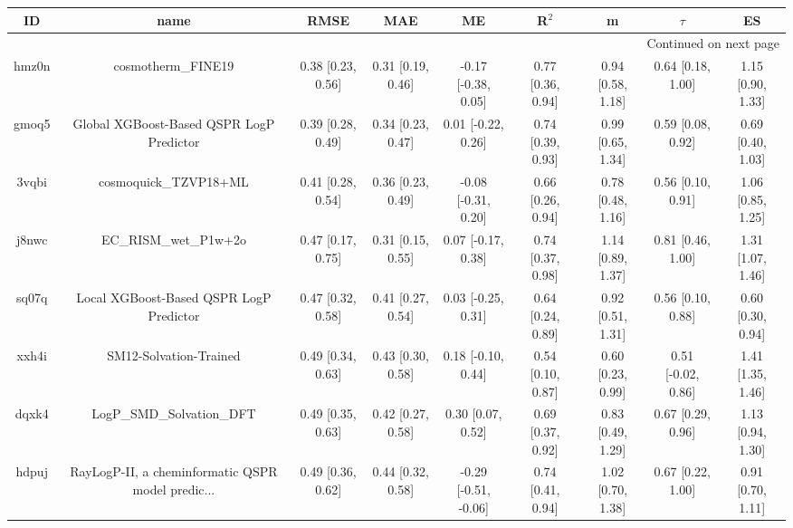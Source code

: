 \documentclass{article}
\begin{document}
\begin{center}
\scriptsize
\begin{longtable}{|ccccccccc|}
\toprule
    ID &                                               name &               RMSE &                MAE &                    ME &              R$^2$ &                    m &               $\tau$ &                    ES \\
\midrule
\endhead
\midrule
\multicolumn{9}{r}{{Continued on next page}} \\
\midrule
\endfoot

\bottomrule
\endlastfoot
 hmz0n &                                 cosmotherm\_FINE19 &  0.38 [0.23, 0.56] &  0.31 [0.19, 0.46] &   -0.17 [-0.38, 0.05] &  0.77 [0.36, 0.94] &    0.94 [0.58, 1.18] &    0.64 [0.18, 1.00] &     1.15 [0.90, 1.33] \\
 gmoq5 &           Global XGBoost-Based QSPR LogP Predictor &  0.39 [0.28, 0.49] &  0.34 [0.23, 0.47] &    0.01 [-0.22, 0.26] &  0.74 [0.39, 0.93] &    0.99 [0.65, 1.34] &    0.59 [0.08, 0.92] &     0.69 [0.40, 1.03] \\
 3vqbi &                              cosmoquick\_TZVP18+ML &  0.41 [0.28, 0.54] &  0.36 [0.23, 0.49] &   -0.08 [-0.31, 0.20] &  0.66 [0.26, 0.94] &    0.78 [0.48, 1.16] &    0.56 [0.10, 0.91] &     1.06 [0.85, 1.25] \\
 j8nwc &                              EC\_RISM\_wet\_P1w+2o &  0.47 [0.17, 0.75] &  0.31 [0.15, 0.55] &    0.07 [-0.17, 0.38] &  0.74 [0.37, 0.98] &    1.14 [0.89, 1.37] &    0.81 [0.46, 1.00] &     1.31 [1.07, 1.46] \\
 sq07q &            Local XGBoost-Based QSPR LogP Predictor &  0.47 [0.32, 0.58] &  0.41 [0.27, 0.54] &    0.03 [-0.25, 0.31] &  0.64 [0.24, 0.89] &    0.92 [0.51, 1.31] &    0.56 [0.10, 0.88] &     0.60 [0.30, 0.94] \\
 xxh4i &                             SM12-Solvation-Trained &  0.49 [0.34, 0.63] &  0.43 [0.30, 0.58] &    0.18 [-0.10, 0.44] &  0.54 [0.10, 0.87] &    0.60 [0.23, 0.99] &   0.51 [-0.02, 0.86] &     1.41 [1.35, 1.46] \\
 dqxk4 &                          LogP\_SMD\_Solvation\_DFT &  0.49 [0.35, 0.63] &  0.42 [0.27, 0.58] &     0.30 [0.07, 0.52] &  0.69 [0.37, 0.92] &    0.83 [0.49, 1.29] &    0.67 [0.29, 0.96] &     1.13 [0.94, 1.30] \\
 hdpuj &  RayLogP-II, a cheminformatic QSPR model predic... &  0.49 [0.36, 0.62] &  0.44 [0.32, 0.58] &  -0.29 [-0.51, -0.06] &  0.74 [0.41, 0.94] &    1.02 [0.70, 1.38] &    0.67 [0.22, 1.00] &     0.91 [0.70, 1.11] \\

\end{longtable}
\end{center}
\end{document}
